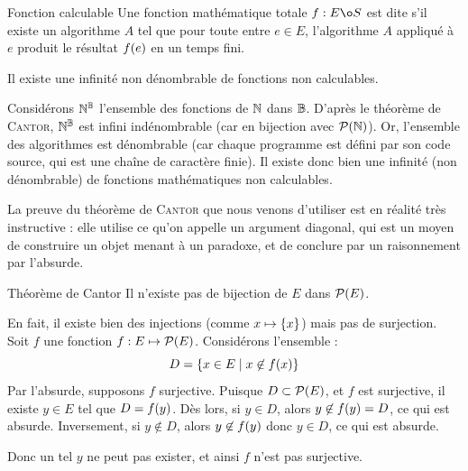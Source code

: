 \documentclass[a4paper,french,bookmarks]{book}
\begin{document}
    \begin{definition}{Fonction calculable}{}
        Une fonction mathématique totale $f: E \o S$ est dite  s'il existe un algorithme $A$ tel que pour toute entre $e \in E$, l'algorithme $A$ appliqué à $e$ produit le résultat $f\!\left(e\right)$ en un temps fini.
    \end{definition}
    
    \begin{theorem}{}{}
        Il existe une infinité non dénombrable de fonctions non calculables.
    \end{theorem}
    
    \begin{nproof}
        Considérons $\mathbb{N}^{\mathbb{B}}$ l'ensemble des fonctions de $\mathbb{N}$ dans $\mathbb{B}$. D'après le théorème de \textsc{Cantor}, $\mathbb{N}^{\mathbb{B}}$ est infini indénombrable (car en bijection avec $\mathcal{P}\!\left(\mathbb{N}\right)$). Or, l'ensemble des algorithmes est dénombrable (car chaque programme est défini par son code source, qui est une chaîne de caractère finie). Il existe donc bien une infinité (non dénombrable) de fonctions mathématiques non calculables.
    \end{nproof}
    
    La preuve du théorème de \textsc{Cantor} que nous venons d'utiliser est en réalité très instructive : elle utilise ce qu'on appelle un argument diagonal, qui est un moyen de construire un objet menant à un paradoxe, et de conclure par un raisonnement par l'absurde.
    
    \begin{theorem}{Théorème de Cantor}
        Il n'existe pas de bijection de $E$ dans $\mathcal{P}(E)$.
    \end{theorem}
    
    \begin{nproof}
        En fait, il existe bien des injections (comme $x \mapsto \left\{x\right\}$) mais pas de surjection. Soit $f$ une fonction $f : E \mapsto \mathcal{P}\!\left(E\right)$. Considérons l'ensemble :
        \[ D = \left\{x \in E \;\middle\vert\; x \not\in f\!\left(x\right)\right\}\]
         Par l'absurde, supposons $f$ surjective. Puisque $D \subset \mathcal{P}\!\left(E\right)$, et $f$ est surjective, il existe $y \in E$ tel que $D = f\!\left(y\right)$. Dès lors, si $y \in D$, alors $y \not\in f\!\left(y\right) = D$, ce qui est absurde. Inversement, si $y \not\in D$, alors $y \not\in f\!\left(y\right)$ donc $y \in D$, ce qui est absurde.
         
         Donc un tel $y$ ne peut pas exister, et ainsi $f$ n'est pas surjective.
    \end{nproof}
    
\end{document}
